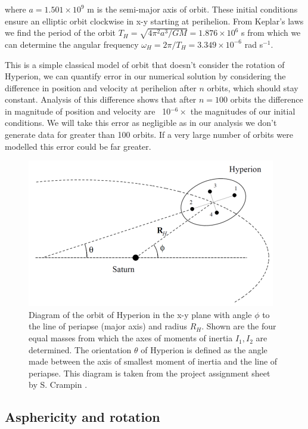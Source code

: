 \documentclass[10pt, twocolumn]{article} %
\begin{document}
where $a = 1.501 \times 10^9$ m is the semi-major axis of orbit. These initial conditions ensure an elliptic orbit clockwise in x-y starting at perihelion. From Keplar's laws we find the period of the orbit $T_H = \sqrt{4\pi^2a^3/GM} = 1.876\times10^6$ s from which we can determine the angular frequency $\omega_H = 2\pi/T_H = 3.349\times10^{-6}$ rad s$^{-1}$.

This is a simple classical model of orbit that doesn't consider the rotation of Hyperion, we can quantify error in our numerical solution by considering the difference in position and velocity at perihelion after $n$ orbits, which should stay constant. Analysis of this difference shows that after $n=100$ orbits the difference in magnitude of position and velocity are ~10$^{-6} \times$ the magnitudes of our initial conditions. We will take this error as negligible as in our analysis we don't generate data for greater than 100 orbits. If a very large number of orbits were modelled this error could be far greater.

\begin{figure}[tb!]
\centering
\includegraphics[width=0.95\columnwidth]{hyperion_orbit_diagram.png}
  \caption{Diagram of the orbit of Hyperion in the x-y plane with angle $\phi$ to the line of periapse (major axis) and radius $R_H$. Shown are the four equal masses from which the axes of moments of inertia $I_1, I_2$ are determined. The orientation $\theta$ of Hyperion is defined as the angle made between the axis of smallest moment of inertia and the line of periapse. This diagram is taken from the project assignment sheet by S. Crampin \cite{Crampin}.}
\label{orientation_diagram}
\end{figure}

\subsection*{Asphericity and rotation}
\end{document}
